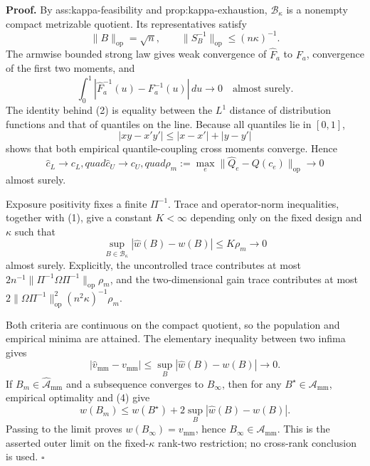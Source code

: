 \textbf{Proof.}
By ass:kappa-feasibility and prop:kappa-exhaustion, \(\mathcal B_\kappa\) is a nonempty compact metrizable quotient.  Its representatives satisfy
\[
\lVert B\rVert_{\mathrm{op}}=\sqrt n,
\qquad \lVert S_B^{-1}\rVert_{\mathrm{op}}\le(n\kappa)^{-1}.
\tag{1}
\]
The armwise bounded strong law gives weak convergence of \(\widehat F_a\) to \(F_a\), convergence of the first two moments, and
\[
\int_0^1|\widehat F_a^{-1}(u)-F_a^{-1}(u)|\,du\longrightarrow0
\quad\text{almost surely}.
\tag{2}
\]
The identity behind (2) is equality between the \(L^1\) distance of distribution functions and that of quantiles on the line.  Because all quantiles lie in \([0,1]\),
\[
|xy-x'y'|\le|x-x'|+|y-y'|
\]
shows that both empirical quantile-coupling cross moments converge.  Hence
\[
\widehat c_L\to c_L,quad \widehat c_U\to c_U,quad
\rho_m:=\max_e\lVert\widehat Q_e-Q(c_e)\rVert_{\mathrm{op}}\to0
\tag{3}
\]
almost surely.

Exposure positivity fixes a finite \(\Pi^{-1}\).  Trace and operator-norm inequalities, together with (1), give a constant \(K<\infty\) depending only on the fixed design and \(\kappa\) such that
\[
\sup_{B\in\mathcal B_\kappa}|\widehat w(B)-w(B)|\le K\rho_m\to0
\tag{4}
\]
almost surely.  Explicitly, the uncontrolled trace contributes at most \(2n^{-1}\lVert\Pi^{-1}\Omega\Pi^{-1}\rVert_{\mathrm{op}}\rho_m\), and the two-dimensional gain trace contributes at most \(2\lVert\Omega\Pi^{-1}\rVert_{\mathrm{op}}^2(n^2\kappa)^{-1}\rho_m\).

Both criteria are continuous on the compact quotient, so the population and empirical minima are attained.  The elementary inequality between two infima gives
\[
|\widehat v_{\mathrm{mm}}-v_{\mathrm{mm}}|
\le\sup_B|\widehat w(B)-w(B)|\to0.
\tag{5}
\]
If \(B_m\in\widehat{\mathcal A}_{\mathrm{mm}}\) and a subsequence converges to \(B_\infty\), then for any \(B^\star\in\mathcal A_{\mathrm{mm}}\), empirical optimality and (4) give
\[
w(B_m)\le w(B^\star)+2\sup_B|\widehat w(B)-w(B)|.
\]
Passing to the limit proves \(w(B_\infty)=v_{\mathrm{mm}}\), hence \(B_\infty\in\mathcal A_{\mathrm{mm}}\).  This is the asserted outer limit on the fixed-\(\kappa\) rank-two restriction; no cross-rank conclusion is used. \(\square\)
